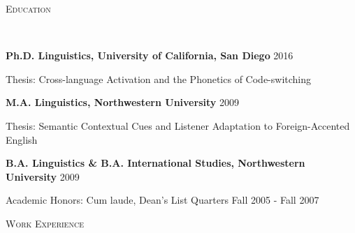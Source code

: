 \documentclass[9pt]{article}
\newenvironment{changemargin}[2]{%
  \begin{list}{}{%
    \setlength{\topsep}{0pt}%
    \setlength{\leftmargin}{#1}%
    \setlength{\rightmargin}{#2}%
    \setlength{\listparindent}{\parindent}%
    \setlength{\itemindent}{\parindent}%
    \setlength{\parsep}{\parskip}%
  }%
  \item[]}{\end{list}
}
\newcommand{\lineover}{
	\begin{changemargin}{-0.05in}{-0.05in}
		\vspace*{-8pt}
		\hrulefill \\
		\vspace*{-2pt}
	\end{changemargin}
}
\newcommand{\header}[1]{
	\begin{changemargin}{-0.5in}{-0.5in}
		\scshape{#1}\\
  	\lineover
	\end{changemargin}
}
\newenvironment{body} {
	\vspace*{-16pt}
	\begin{changemargin}{-0.25in}{-0.5in}
  }	
	{\end{changemargin}
}
\begin{document}
\smallskip


\header{\color{red}Education}

\begin{body}
	\vspace{14pt}
	
	\textbf{Ph.D. Linguistics, University of California, San Diego} \hfill 2016{} \\
	\begin{small}
		Thesis: Cross-language Activation and the Phonetics of Code-switching\\
	\end{small}
 	 \medskip
	 \medskip

	\textbf{M.A. Linguistics, Northwestern University} \hfill 2009 \\
	\begin{small}
		Thesis: Semantic Contextual Cues and Listener Adaptation to Foreign-Accented English\\
	\end{small}
 	 \medskip
	 \medskip

	\textbf{B.A. Linguistics \& B.A. International Studies, Northwestern University} \hfill 2009 \\
	\begin{small}
		Academic Honors: Cum laude, Dean's List Quarters Fall 2005 - Fall 2007\\
	\end{small}
	\medskip

\end{body}

\smallskip


\header{\color{red}Work Experience}
\end{document}
